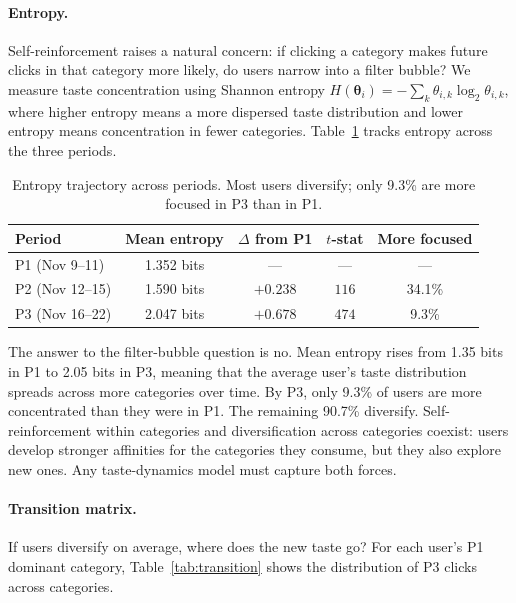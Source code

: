 \documentclass[11pt]{article}
\begin{document}
\paragraph{Entropy.} Self-reinforcement raises a natural concern: if clicking a category makes future clicks in that category more likely, do users narrow into a filter bubble? We measure taste concentration using Shannon entropy $H(\boldsymbol{\theta}_i) = -\sum_k \theta_{i,k} \log_2 \theta_{i,k}$, where higher entropy means a more dispersed taste distribution and lower entropy means concentration in fewer categories. Table~\ref{tab:entropy} tracks entropy across the three periods.
\begin{table}[ht]
\centering
\caption{Entropy trajectory across periods. Most users diversify; only 9.3\% are more focused in P3 than in P1.}
\label{tab:entropy}
\begin{tabular}{lcccc}
\toprule
Period & Mean entropy & $\Delta$ from P1 & $t$-stat & More focused \\
\midrule
P1 (Nov 9--11) & 1.352 bits & --- & --- & --- \\
P2 (Nov 12--15) & 1.590 bits & $+0.238$ & $116$ & 34.1\% \\
P3 (Nov 16--22) & 2.047 bits & $+0.678$ & $474$ & 9.3\% \\
\bottomrule
\end{tabular}
\end{table}
\FloatBarrier

The answer to the filter-bubble question is no. Mean entropy rises from 1.35 bits in P1 to 2.05 bits in P3, meaning that the average user's taste distribution spreads across more categories over time. By P3, only 9.3\% of users are more concentrated than they were in P1. The remaining 90.7\% diversify. Self-reinforcement within categories and diversification across categories coexist: users develop stronger affinities for the categories they consume, but they also explore new ones. Any taste-dynamics model must capture both forces.

\paragraph{Transition matrix.} If users diversify on average, where does the new taste go? For each user's P1 dominant category, Table~\ref{tab:transition} shows the distribution of P3 clicks across categories.
\end{document}
